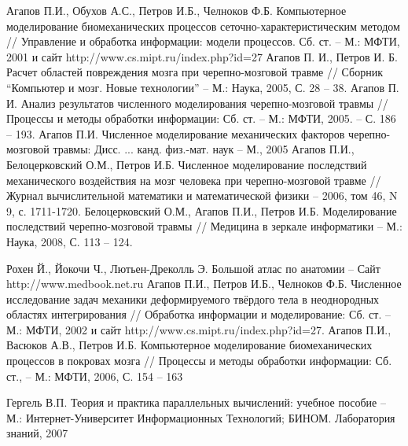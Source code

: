 \begin{thebibliography}{99}
 Агапов П.И., Обухов А.С., Петров И.Б., Челноков Ф.Б. Компьютерное моделирование биомеханических процессов сеточно-характеристическим методом // Управление и обработка информации: модели процессов. Сб. ст. – М.: МФТИ, 2001 и сайт http://www.cs.mipt.ru/index.php?id=27
 Агапов П. И., Петров И. Б. Расчет областей повреждения мозга при черепно-мозговой травме // Сборник “Компьютер и мозг. Новые технологии” – М.: Наука, 2005, С. 28 – 38.
 Агапов П. И. Анализ результатов численного моделирования черепно-мозговой травмы // Процессы и методы обработки информации: Сб. ст. – М.: МФТИ, 2005. – С. 186 – 193.
 Агапов П.И. Численное моделирование механических факторов черепно-мозговой травмы: Дисс. ... канд. физ.-мат. наук – М., 2005
Агапов П.И., Белоцерковский О.М., Петров И.Б. Численное моделирование последствий механического воздействия на мозг человека при черепно-мозговой травме // Журнал вычислительной математики и математической физики – 2006, том 46, N 9, с. 1711-1720.
 Белоцерковский О.М., Агапов П.И., Петров И.Б. Моделирование последствий черепно-мозговой травмы // Медицина в зеркале информатики – М.: Наука, 2008, С. 113 – 124.

 Рохен Й., Йокочи Ч., Лютьен-Дреколль Э. Большой атлас по анатомии – Сайт http://www.medbook.net.ru
 Агапов П.И., Петров И.Б., Челноков Ф.Б. Численное исследование задач механики деформируемого твёрдого тела в неоднородных областях интегрирования // Обработка информации и моделирование: Сб. ст. – М.: МФТИ, 2002 и сайт http://www.cs.mipt.ru/index.php?id=27.
 Агапов П.И., Васюков А.В., Петров И.Б. Компьютерное моделирование биомеханических процессов в покровах мозга // Процессы и методы обработки информации: Сб. ст., – М.: МФТИ, 2006, С. 154 – 163

 Гергель В.П. Теория и практика параллельных вычислений: учебное пособие – М.: Интернет-Университет Информационных Технологий; БИНОМ. Лаборатория знаний, 2007


\end{thebibliography}
